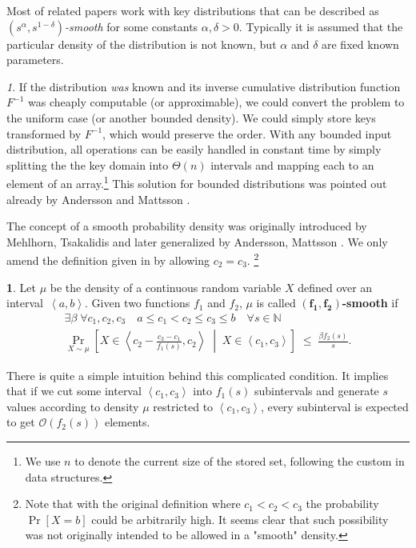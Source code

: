 \documentclass[
submission
]{dmtcs-episciences}
\theoremstyle{plain}
\theoremstyle{definition}
\newtheorem{defn}[thm]{\protect\definitionname}
\theoremstyle{remark}
\newtheorem*{rem*}{\protect\remarkname}
\theoremstyle{plain}
\theoremstyle{plain}
\providecommand{\definitionname}{Definition}
\providecommand{\remarkname}{Remark}
\def\interval#1#2{\left\langle#1,#2\right\rangle}
\def\lespaces{\;\le\;}
\def\Prob#1{\Pr\!\left[#1\right]}
\def\ProbParam#1#2{\Pr_{#1}\!\left[#2\right]}
\def\OO{\mathcal O}
\def\natural{\mathbb{N}}
\def\emphDef#1{{\bf#1}}
\def\emphDefMath#1{\mathbf{#1}}
\begin{document}
Most of related papers work with key distributions that can be described
as \emph{$\left(s^{\alpha},s^{1-\delta}\right)$-smooth} for some
constants $\alpha,\delta>0$. Typically it is assumed that the particular
density of the distribution is not known, but $\alpha$ and $\delta$
are fixed known parameters.
\begin{rem*}
If the distribution \emph{was} known and its inverse cumulative distribution
function $F^{-1}$ was cheaply computable (or approximable), we could
convert the problem to the uniform case (or another bounded density).
We could simply store keys transformed by $F^{-1}$, which would preserve
the order. With any bounded input distribution, all operations can
be easily handled in constant time by simply splitting the the key
domain into $\Theta(n)$ intervals and mapping each to an element
of an array.\footnote{We use $n$ to denote the current size of the stored set, following
the custom in data structures.} This solution for bounded distributions was pointed out already by
Andersson and Mattsson \cite[sec. 5.2]{AndersM93}.
\end{rem*}
The concept of a smooth probability density was originally introduced by Mehlhorn, Tsakalidis \cite{MehlT93} and later generalized by Andersson, Mattsson \cite{AndersM93}. We only amend the definition given in \cite{AndersM93,KMSTTZ06} by allowing $c_2 = c_3$.%
	\footnote{
		Note that with the original definition where $c_1 < c_2 < c_3$ the probability $\Prob{X = b}$ could be arbitrarily high.
		It seems clear that such possibility was not originally intended to be allowed in a "smooth" density.
		}
\begin{defn}%
 \label{def:smooth}
	Let $\mu$ be the density of a continuous random variable $X$ defined over an interval~$\interval a b$. Given two functions $f_1$ and $f_2$, $\mu$ is called \emphDef{$\emphDefMath{(f_1,f_2)}$-smooth} if
	\begin{multline*}
		\exists\beta \; \forall c_1,c_2,c_3 \quad a \le c_1 < c_2 \le c_3 \le b \quad \forall s \in \natural \\
		\ProbParam{X \sim \mu}{  X \in \interval{ c_2 - \frac{c_3-c_1}{f_1(s)} }{c_2} \; \middle| \; X \in \interval{c_1}{c_3}  }
		\lespaces \frac{\beta f_2(s)}{s}.
	\end{multline*}
\end{defn}

There is quite a simple intuition behind this complicated condition. It implies that if we cut some interval $\interval{c_1}{c_3}$ into $f_1(s)$ subintervals and generate $s$ values according to density $\mu$ restricted to $\interval{c_1}{c_3}$, every subinterval is expected to get $\OO(f_2(s))$ elements.
\end{document}
